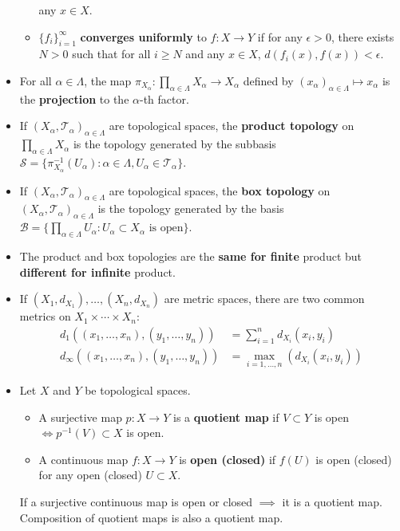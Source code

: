 \documentclass[frenchspacing,9pt,landscape,a4paper]{article}
\theoremstyle{remark}
\begin{document}
\begin{multicols}{4}
\begin{itemize}
\begin{itemize}
             any  $x\in X$.
         \item  $\{f_i\}_{i=1}^\infty$ \textbf{converges uniformly} to  $f:X\to Y$ if for any $\epsilon>0$,
             there exists  $N>0$ such that for all  $i\geq N$ and any  $x\in X$,
             $d(f_i(x),f(x))<\epsilon$.
    \end{itemize}
\item For all $\alpha\in\Lambda$, the map  $\pi_{X_\alpha}:\prod_{\alpha\in\Lambda}X_\alpha\to
             X_\alpha$ defined by  $(x_\alpha)_{\alpha\in\Lambda}\mapsto x_\alpha$ is the
             \textbf{projection} to the  $\alpha$-th factor.
         \item If $(X_\alpha,\mathcal{T}_\alpha)_{\alpha\in\Lambda}$ are topological spaces, the
            \textbf{product topology} on  $\prod_{\alpha\in\Lambda}X_\alpha$ is the topology generated by
            the subbasis
            $\mathcal{S}=\{\pi_{X_\alpha}^{-1}(U_\alpha):\alpha\in\Lambda,U_\alpha\in\mathcal{T}_\alpha\}$.
        \item If  $(X_\alpha,\mathcal{T}_\alpha)_{\alpha\in\Lambda}$ are topological spaces, the
            \textbf{box topology} on  $(X_\alpha,\mathcal{T}_\alpha)_{\alpha\in\Lambda}$ is the topology
            generated by the basis  $\mathcal{B}=\{\prod_{\alpha\in\Lambda}U_\alpha:U_\alpha\subset
            X_\alpha\text{ is open}\}$.
        \item The product and box topologies are the \textbf{same for finite} product but
    \textbf{different for infinite} product.
\item If $(X_1,d_{X_1}),\dots,(X_n,d_{X_n})$ are metric spaces, there are two common metrics on
    $X_1\times\cdots\times X_n$:
    \begin{align*}
        d_1((x_1,\dots,x_n),(y_1,\dots,y_n))&=\sum_{i=1}^n d_{X_i}(x_i,y_i)\\
        d_\infty((x_1,\dots,x_n),(y_1,\dots,y_n))&=\max_{i=1,\dots,n}(d_{X_i}(x_i,y_i)) 
    \end{align*}
\item Let $X$ and  $Y$ be topological spaces.
     \begin{itemize}
         \item A surjective map $p:X\to Y$ is a \textbf{quotient map} if  $V\subset Y$ is open  $\iff
             p^{-1}(V)\subset X$ is open.
         \item A continuous map  $f:X\to Y$ is \textbf{open (closed)} if  $f(U)$ is open (closed) for any open
             (closed)  $U\subset X$.
    \end{itemize} If a surjective continuous map is open or closed $\implies$ it is a quotient map. Composition of quotient maps is also a quotient map.

\end{itemize}
\end{multicols}
\end{document}
